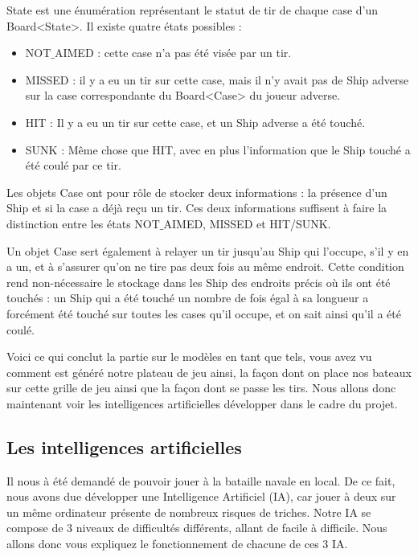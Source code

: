 	State est une énumération représentant le statut de tir de chaque case d'un Board<State>. Il existe quatre états possibles :
	\begin{itemize}
		\item NOT$\_$AIMED : cette case n'a pas été visée par un tir.
		\item MISSED : il y a eu un tir sur cette case, mais il n'y avait pas de Ship adverse sur la case correspondante du Board<Case> du joueur adverse.
		\item HIT : Il y a eu un tir sur cette case, et un Ship adverse a été touché.
		\item SUNK : Même chose que HIT, avec en plus l'information que le Ship touché a été coulé par ce tir.
	\end{itemize}

	Les objets Case ont pour rôle de stocker deux informations : la présence d'un Ship et si la case a déjà reçu un tir. Ces deux informations suffisent à faire la distinction entre les états NOT$\_$AIMED, MISSED et HIT/SUNK. \newline
	
	Un objet Case sert également à relayer un tir jusqu'au Ship qui l'occupe, s'il y en a un, et à s'assurer qu'on ne tire pas deux fois au même endroit. Cette condition rend non-nécessaire le stockage dans les Ship des endroits précis où ils ont été touchés : un Ship qui a été touché un nombre de fois égal à sa longueur a forcément été touché sur toutes les cases qu'il occupe, et on sait ainsi qu'il a été coulé.\newline	
	
	Voici ce qui conclut la partie sur le modèles en tant que tels, vous avez vu comment est généré notre plateau de jeu ainsi, la façon dont on place nos bateaux sur cette grille de jeu ainsi que la façon dont se passe les tirs. Nous allons donc maintenant voir les intelligences artificielles développer dans le cadre du projet.
	
	\newpage

\subsection{Les intelligences artificielles}
	Il nous à été demandé de pouvoir jouer à la bataille navale en local. 
De ce fait, nous avons due développer une Intelligence Artificiel (IA), car jouer à deux sur un même ordinateur présente de nombreux risques de triches.\newline
	Notre IA se compose de 3 niveaux de difficultés différents, allant de facile à difficile.\newline
	Nous allons donc vous expliquez le fonctionnement de chacune de ces 3 IA.\newline

